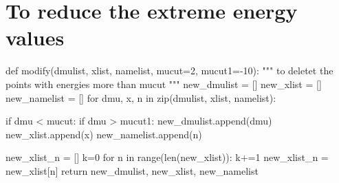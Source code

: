 \section{To reduce the extreme energy values}
\begin{verbnobox}[\rmfamily]
def modify(dmulist, xlist, namelist, mucut=2, mucut1=-10):
    """
    to deletet the points with energies more than mucut
    """
    new_dmulist = []
    new_xlist = []
    new_namelist = []
    for dmu, x, n in zip(dmulist, xlist, namelist):

        if dmu < mucut:
            if dmu > mucut1:
                new_dmulist.append(dmu)
                new_xlist.append(x)
                new_namelist.append(n)

    new_xlist_n = []
    k=0
    for n in range(len(new_xlist)):
        k+=1
        new_xlist_n = new_xlist[n]
    return new_dmulist, new_xlist, new_namelist
\end{verbnobox}

